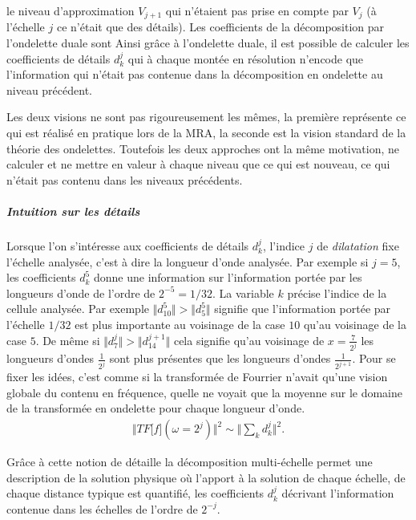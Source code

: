             le niveau d'approximation $V_{j+1}$ qui n'étaient pas prise en compte par $V_j$ (à l'échelle $j$ ce n'était que des détails). 
            Les coefficients de la décomposition par l'ondelette duale sont  Ainsi grâce à l'ondelette duale, 
            il est possible de calculer les coefficients de détails $d_k^j$ qui à chaque montée en résolution n'encode que l'information qui n'était 
            pas contenue dans la décomposition en ondelette au niveau précédent.\par
            Les deux visions ne sont pas rigoureusement les mêmes, la première représente ce qui est réalisé en pratique lors de la MRA, la seconde 
            est la vision standard de la théorie des ondelettes. Toutefois les deux approches ont la même motivation, ne calculer et ne mettre en valeur à chaque
            niveau que ce qui est nouveau, ce qui n'était pas contenu dans les niveaux précédents.
        
        \subparagraph{Intuition sur les détails}
            Lorsque l'on s'intéresse aux coefficients de détails $d_k^j$,
            l'indice $j$ de \textit{dilatation} fixe l'échelle analysée, c'est à dire la longueur d'onde analysée. Par exemple si $j=5$, 
            les coefficients $d^5_k$ donne une information sur l'information portée par les longueurs d'onde de l'ordre de $2^{-5} = 1/32$.
            La variable $k$ précise l'indice de la cellule analysée.
            Par exemple $\Vert d^5_10 \Vert > \Vert d^5_5 \Vert$ signifie que l'information portée par l'échelle $1/32$
            est plus importante au voisinage de la case $10$ qu'au voisinage de la case $5$.
            De même si $\Vert d^j_7 \Vert > \Vert d^{j+1}_{14} \Vert$ cela signifie qu'au voisinage de $x=\frac{7}{2^j}$
            les longueurs d'ondes $\frac{1}{2^j}$ sont plus présentes que les longueurs d'ondes $\frac{1}{2^{j+1}}.$
            Pour se fixer les idées, c'est comme si la transformée de Fourrier n'avait qu'une vision globale du contenu en fréquence, 
            quelle ne voyait que la moyenne sur le domaine de la transformée en ondelette pour chaque longueur d'onde.
            \begin{align}
                \Vert TF\bigl[ f \bigr](\omega = 2^j) \Vert^2 \sim \Vert \sum_{k} d^j_k \Vert^2.
            \end{align}
            \par 
            Grâce à cette notion de détaille la décomposition multi-échelle permet une description de la solution physique où l'apport à la solution de chaque échelle,
            de chaque distance typique est quantifié, les coefficients $d_k^j$ décrivant l'information contenue dans les échelles de l'ordre de $2^{-j}$.
